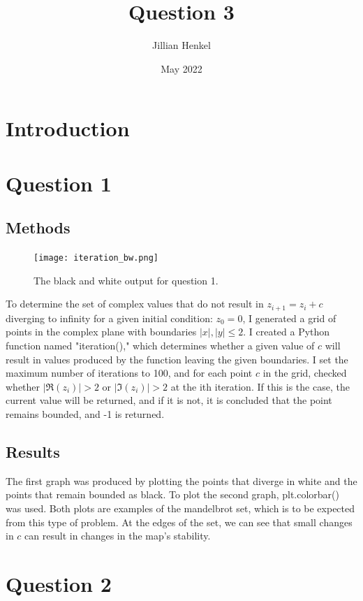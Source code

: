 \documentclass{article}
\title{Question 3}
\author{Jillian Henkel}
\date{May 2022}
\begin{document}
\maketitle

\section*{Introduction}
\section*{Question 1}
\subsection*{Methods}
\begin{figure}
    \texttt{[image: iteration\_bw.png]}
    \caption{The black and white output for question 1.}
    \label{fig:iteration_bw}
\end{figure}

To determine the set of complex values that do not result in $z_{i + 1} = z_i + c$ diverging to infinity for a given initial condition: $z_0 = 0$, I generated a grid of points in the complex plane with boundaries $|x|, |y| \leq 2$. I created a Python function named "iteration()," which determines whether a given value of $c$ will result in values produced by the function leaving the given boundaries. I set the maximum number of iterations to 100, and for each point  $c$ in the grid, checked whether $|\mathfrak{R}(z_i)| > 2$ or $|\mathfrak{I}(z_i)| > 2$ at the ith iteration. If this is the case, the current value will be returned, and if it is not, it is concluded that the point remains bounded, and -1 is returned.
\subsection*{Results}
The first graph was produced by plotting the points that diverge in white and the points that remain bounded as black. To plot the second graph, plt.colorbar() was used. Both plots are examples of the mandelbrot set,  which is to be expected from this type of problem. At the edges of the set, we can see that small changes in $c$ can result in changes in the map's stability.


\section*{Question 2}
\end{document}
